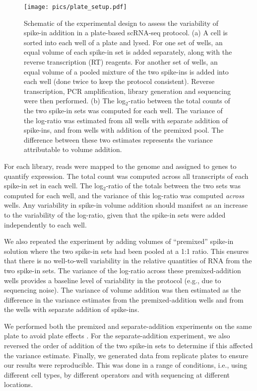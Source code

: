 \documentclass{article}
\begin{document}
\begin{figure}[tbp]
\begin{center}
\texttt{[image: pics/plate\_setup.pdf]}
\end{center}
\caption{Schematic of the experimental design to assess the variability of spike-in addition in a plate-based scRNA-seq protocol.
(a) A cell is sorted into each well of a plate and lysed.
For one set of wells, an equal volume of each spike-in set is added separately, along with the reverse transcription (RT) reagents.
For another set of wells, an equal volume of a pooled mixture of the two spike-ins is added into each well (done twice to keep the protocol consistent).
Reverse transcription, PCR amplification, library generation and sequencing were then performed.
(b) The log$_2$-ratio between the total counts of the two spike-in sets was computed for each well.
The variance of the log-ratio was estimated from all wells with separate addition of spike-ins, and from wells with addition of the premixed pool.
The difference between these two estimates represents the variance attributable to volume addition.
}
\label{fig:expdesign}
\end{figure}

For each library, reads were mapped to the genome and assigned to genes to quantify expression.
The total count was computed across all transcripts of each spike-in set in each well.
The log$_2$-ratio of the totals between the two sets was computed for each well, and the variance of this log-ratio was computed \textit{across} wells.
Any variability in spike-in volume addition should manifest as an increase to the variability of the log-ratio, given that the spike-in sets were added independently to each well.

We also repeated the experiment by adding volumes of ``premixed'' spike-in solution where the two spike-in sets had been pooled at a 1:1 ratio.
This ensures that there is no well-to-well variability in the relative quantities of RNA from the two spike-in sets.
The variance of the log-ratio across these premixed-addition wells provides a baseline level of variability in the protocol (e.g., due to sequencing noise).
The variance of volume addition was then estimated as the difference in the variance estimates from the premixed-addition wells and from the wells with separate addition of spike-ins.

We performed both the premixed and separate-addition experiments on the same plate to avoid plate effects \cite{hicks2015widespread,tung2016batch}.
For the separate-addition experiment, we also reversed the order of addition of the two spike-in sets to determine if this affected the variance estimate.
Finally, we generated data from replicate plates to ensure our results were reproducible.
This was done in a range of conditions, i.e., using different cell types, by different operators and with sequencing at different locations.
\end{document}
